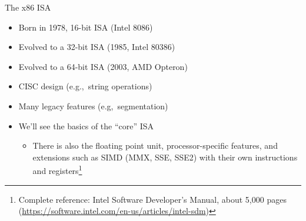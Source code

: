 \documentclass[]{beamer}
\begin{document}
\begin{frame}{The x86 ISA}
\begin{itemize}
	\item Born in 1978, 16-bit ISA (Intel 8086)
	\item Evolved to a 32-bit ISA (1985, Intel 80386)
	\item Evolved to a 64-bit ISA (2003, AMD Opteron)
	\item CISC design (e.g.,~string operations)
	\item Many legacy features (e.g,~segmentation)
	\item We'll see the basics of the ``core'' ISA
		\begin{itemize}
			\item There is also the floating point unit, processor-specific features, and extensions such as SIMD (MMX, SSE, SSE2) with their own instructions and registers\footnote{Complete reference: Intel Software Developer's Manual, about 5,000 pages (\url{https://software.intel.com/en-us/articles/intel-sdm})}
		\end{itemize}
\end{itemize}
\end{frame}
\end{document}
